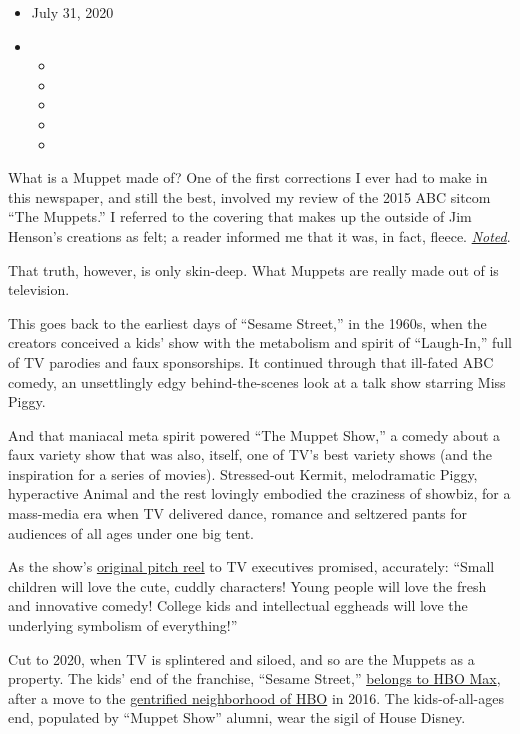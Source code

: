 \begin{itemize}
\item
  July 31, 2020
\item
  \begin{itemize}
  \item
  \item
  \item
  \item
  \item
  \end{itemize}
\end{itemize}

What is a Muppet made of? One of the first corrections I ever had to
make in this newspaper, and still the best, involved my review of the
2015 ABC sitcom ``The Muppets.'' I referred to the covering that makes
up the outside of Jim Henson's creations as felt; a reader informed me
that it was, in fact, fleece.
\href{https://www.nytimes.com/2015/09/22/arts/television/review-muppets-abc-kermit-ms-piggy.html}{\emph{Noted}}.

That truth, however, is only skin-deep. What Muppets are really made out
of is television.

This goes back to the earliest days of ``Sesame Street,'' in the 1960s,
when the creators conceived a kids' show with the metabolism and spirit
of ``Laugh-In,'' full of TV parodies and faux sponsorships. It continued
through that ill-fated ABC comedy, an unsettlingly edgy
behind-the-scenes look at a talk show starring Miss Piggy.

And that maniacal meta spirit powered ``The Muppet Show,'' a comedy
about a faux variety show that was also, itself, one of TV's best
variety shows (and the inspiration for a series of movies). Stressed-out
Kermit, melodramatic Piggy, hyperactive Animal and the rest lovingly
embodied the craziness of showbiz, for a mass-media era when TV
delivered dance, romance and seltzered pants for audiences of all ages
under one big tent.

As the show's
\href{https://www.youtube.com/watch?v=9KorhvVQRUM}{original pitch reel}
to TV executives promised, accurately: ``Small children will love the
cute, cuddly characters! Young people will love the fresh and innovative
comedy! College kids and intellectual eggheads will love the underlying
symbolism of everything!''

Cut to 2020, when TV is splintered and siloed, and so are the Muppets as
a property. The kids' end of the franchise, ``Sesame Street,''
\href{https://www.nytimes.com/2019/10/03/business/media/sesame-street-hbo-max.html}{belongs
to HBO Max}, after a move to the
\href{https://www.nytimes.com/2016/01/15/arts/television/tv-review-sesame-street-hbo.html}{gentrified
neighborhood of HBO} in 2016. The kids-of-all-ages end, populated by
``Muppet Show'' alumni, wear the sigil of House Disney.

